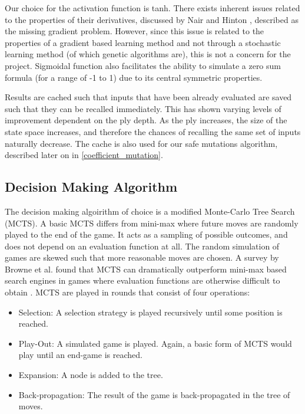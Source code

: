 \documentclass[12pt,a4paper]{article}
\begin{document}
        Our choice for the activation function is tanh.
        There exists inherent issues related to the properties of their derivatives, discussed by Nair and Hinton \cite{nair_rectified_2010}, described as the missing gradient problem. However, since this issue is related to the properties of a gradient based learning method and not through a stochastic learning method (of which genetic algorithms are), this is not a concern for the project. Sigmoidal function also facilitates the ability to simulate a zero sum formula (for a range of -1 to 1) due to its central symmetric properties.

        Results are cached such that inputs that have been already evaluated are saved such that they can be recalled immediately. This has shown varying levels of improvement dependent on the ply depth. As the ply increases, the size of the state space increases, and therefore the chances of recalling the same set of inputs naturally decrease. The cache is also used for our safe mutations algorithm, described later on in \ref{coefficient_mutation}.
    
    \subsection{Decision Making Algorithm}
       The decision making algoirithm of choice is a modified Monte-Carlo Tree Search (MCTS). A basic MCTS differs from mini-max where future moves are randomly played to the end of the game. It acts as a sampling of possible outcomes, and does not depend on an evaluation function at all. The random simulation of games are skewed such that more reasonable moves are chosen. A survey by Browne et al. found that MCTS can dramatically outperform mini-max based search engines in games where evaluation functions are otherwise difficult to obtain \cite{browne_survey_2012}. MCTS are played in rounds that consist of four operations:

        \begin{itemize}
            \item Selection: A selection strategy is played recursively until some position is reached. 
            \item Play-Out: A simulated game is played. Again, a basic form of MCTS would play until an end-game is reached.
            \item Expansion: A node is added to the tree.
            \item Back-propagation: The result of the game is back-propagated in the tree of moves.
        \end{itemize}
\end{document}
